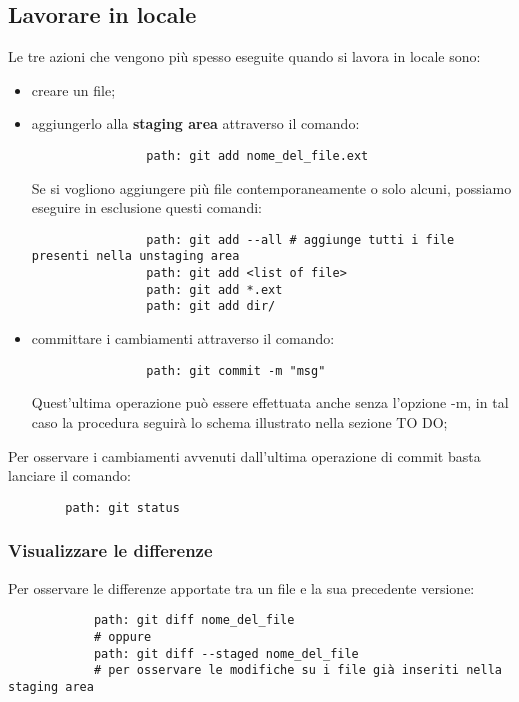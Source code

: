 	\subsection{Lavorare in locale} %
	\label{sub:lavorare_in_locale}
	Le tre azioni che vengono più spesso eseguite quando si lavora in locale sono:
		\begin{itemize}
			\item creare un file;
			\item aggiungerlo alla \textbf{staging area} attraverso il comando:
				\begin{verbatim}
				path: git add nome_del_file.ext
				\end{verbatim}
				\noindent
				Se si vogliono aggiungere più file contemporaneamente o solo alcuni, possiamo eseguire in esclusione questi comandi:
				\begin{verbatim}
				path: git add --all # aggiunge tutti i file presenti nella unstaging area
				path: git add <list of file>
				path: git add *.ext
				path: git add dir/
				\end{verbatim}
				
			\item committare i cambiamenti attraverso il comando:
				\begin{verbatim}
				path: git commit -m "msg"
				\end{verbatim}
				\noindent
				Quest'ultima operazione può essere effettuata anche senza l'opzione -m, in tal caso la procedura seguirà lo schema illustrato nella sezione TO DO;
		\end{itemize}
	\noindent
	Per osservare i cambiamenti avvenuti dall'ultima operazione di commit basta lanciare il comando:
		\begin{verbatim}
		path: git status
		\end{verbatim}
	
		\subsubsection{Visualizzare le differenze} %
		\label{ssub:visualizzare_le_differenze}
		Per osservare le differenze apportate tra un file e la sua precedente versione:
			\begin{verbatim}
			path: git diff nome_del_file
			# oppure
			path: git diff --staged nome_del_file
			# per osservare le modifiche su i file già inseriti nella staging area
			\end{verbatim}

		

